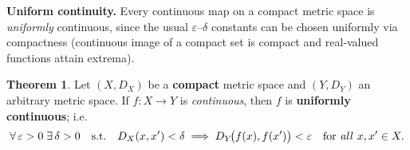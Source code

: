 \documentclass[12pt]{article}
\theoremstyle{definition} %
\newtheorem{theorem}{Theorem}
\theoremstyle{plain} %
\begin{document}
\medskip\noindent
\textbf{Uniform continuity.}\;
Every continuous map on a compact metric space is \emph{uniformly}
continuous, since the usual $\varepsilon$–$\delta$ constants can be
chosen uniformly via compactness (continuous image of a compact set is
compact and real‐valued functions attain extrema).
\begin{theorem}\label{thm:compact_uc}
  Let $(X,D_X)$ be a \textbf{compact} metric space and  
  $(Y,D_Y)$ an arbitrary metric space.
  If $f:X\to Y$ is \emph{continuous}, then $f$ is
  \textbf{uniformly continuous}; i.e.
  \[
      \forall\,\varepsilon>0\;\exists\,\delta>0
      \quad\text{s.t.}\quad
      D_X(x,x')<\delta\;\Longrightarrow\;
      D_Y\!\bigl(f(x),f(x')\bigr)<\varepsilon
      \quad\text{for \emph{all }}x,x'\in X.
  \]
\end{theorem}
\end{document}
